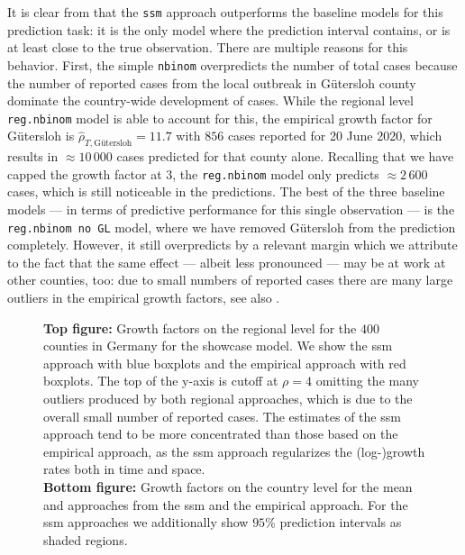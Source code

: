 It is clear from  that the \texttt{ssm} approach outperforms the baseline models for this prediction task: it is the only model where the prediction interval contains, or is at least close to the true observation. There are multiple reasons for this behavior. First, the simple \texttt{nbinom} overpredicts the number of total cases because the number of reported cases from the local outbreak in Gütersloh county dominate the country-wide development of cases. While the regional level \texttt{reg.nbinom} model is able to account for this, the empirical growth factor for Gütersloh is $\hat \rho_{T, \text{Gütersloh}} = 11.7$ with $856$ cases reported for 20 June 2020, which results in $\approx 10\,000$ cases predicted for that county alone. Recalling that we have capped the growth factor at $3$, the \texttt{reg.nbinom}  model only predicts $\approx 2\,600$ cases, which is still noticeable in the predictions. 
The best of the three baseline models --- in terms of predictive performance for this single observation --- is the \texttt{reg.nbinom no GL} model, where we have removed Gütersloh from the prediction completely. However, it still overpredicts by a relevant margin which we attribute to the fact that the same effect --- albeit less pronounced --- may be at work at other counties, too: due to small numbers of reported cases there are many large outliers in the empirical growth factors, see also . 

\begin{figure}
    \resizebox{\textwidth}{!}{%
    }
    \caption{%
        \textbf{Top figure:} Growth factors on the regional level for the $400$ counties in Germany for the showcase model. We show the \gls{ssm} approach with blue boxplots and the empirical approach with red boxplots. The top of the y-axis is cutoff at $\rho = 4$ omitting the many outliers produced by both regional approaches, which is due to the overall small number of reported cases. The estimates of the \gls{ssm} approach tend to be more concentrated than those based on the empirical approach, as the \gls{ssm} approach regularizes the (log-)growth rates both in time and space.\\
        \textbf{Bottom figure:} Growth factors on the country level for the mean and  approaches from the \gls{ssm} and the empirical approach. For the \gls{ssm} approaches we additionally show $95\%$ prediction intervals as shaded regions.}
    \label{fig:regional_showcase_rho.tex}
\end{figure}

